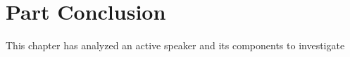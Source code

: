 \section{Part Conclusion}
This chapter has analyzed an active speaker and its components to investigate